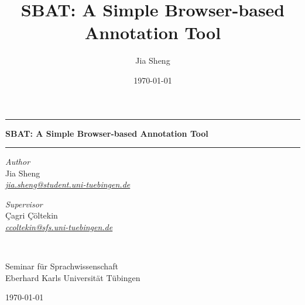 \documentclass[a4paper]{article}
\title{SBAT: A Simple Browser-based Annotation Tool}
\author{Jia Sheng}
\date{\today}
\begin{document}
\begin{titlepage}
\begin{center}

\hrule
\vspace{0.6cm}
{\bfseries\huge
SBAT: A Simple Browser-based Annotation Tool
}\\[1cm] 
\hrule
\vspace*{.05\textheight}
 
\begin{minipage}[t]{0.49\textwidth}
\begin{flushleft} 
{\large
\textit{Author}\\
Jia Sheng}\\
\href{mailto:jia.sheng@student.uni-tuebingen.de}{\textit{jia.sheng@student.uni-tuebingen.de}}\\
\end{flushleft}
\end{minipage}
\begin{minipage}[t]{0.49\textwidth}
\begin{flushright}
{\large
\textit{Supervisor}\\
Çagri Çöltekin}\\
\href{mailto:ccoltekin@sfs.uni-tuebingen.de}{\textit{ccoltekin@sfs.uni-tuebingen.de}}\\
\end{flushright}
\end{minipage}\\

\vfill

\vspace*{.1\textheight}

{\large Seminar für Sprachwissenschaft\\
Eberhard Karls Universität Tübingen

\vspace{1em}
\today}
\end{center}
\end{titlepage}


% 

\newpage
\newpage

\end{document}
